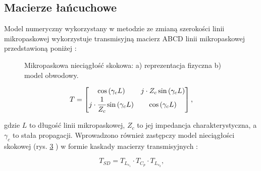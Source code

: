 \subsection{Macierze łańcuchowe}

Model numeryczny wykorzystany w metodzie ze zmianą szerokości linii mikropaskowej wykorzystuje transmisyjną macierz ABCD linii mikropaskowej przedstawioną poniżej \cite{cite:microstrip_book}:

  \begin{figure}[tbh!]
     \centering
     \begin{subfigure}[b]{0.49\textwidth}
         \centering
         {}
         \caption{}
         \label{fig:step_discontinuity_physical}
     \end{subfigure}
     \hfill
     \begin{subfigure}[b]{0.49\textwidth}
         \centering
         {}
         \caption{}
         \label{fig:step_discontinuity_schematic}
     \end{subfigure}
        \caption{Mikropaskowa nieciągłość skokowa: a) reprezentacja fizyczna
b) model obwodowy.}
        \label{fig:step_discontinuity}
\end{figure}



\begin{equation}
    \label{microstrip_T_matrix_general_eq}
     T= \begin{bmatrix}
          \cos{\left( \gamma_c L \right)} & j \cdot Z_c\sin{\left( \gamma_c L \right)} \\
          j \cdot \cfrac{1}{Z_c} \sin{\left( \gamma_c L \right)} & \cos{\left( \gamma_c L \right)}
      \end{bmatrix} \text{,}
 \end{equation}

 \noindent gdzie $L$ to długość linii mikropaskowej, $Z_c$ to jej impedancja charakterystyczna, a $\gamma_c$ to stała propagacji. Wprowadzono również zastępczy model nieciągłości skokowej (rys. \ref{fig:step_discontinuity} \cite{cite:microstrip_book}) w formie kaskady macierzy transmisyjnych \cite{cite:microstrip_book,cite:pozar}:

 \begin{equation}
    \label{step_discontinuity_matrix_general_eq}
      T_{SD} = T_{L_{s_1}} \cdot T_{C_p} \cdot T_{L_{s_2}} \text{,}
 \end{equation}

